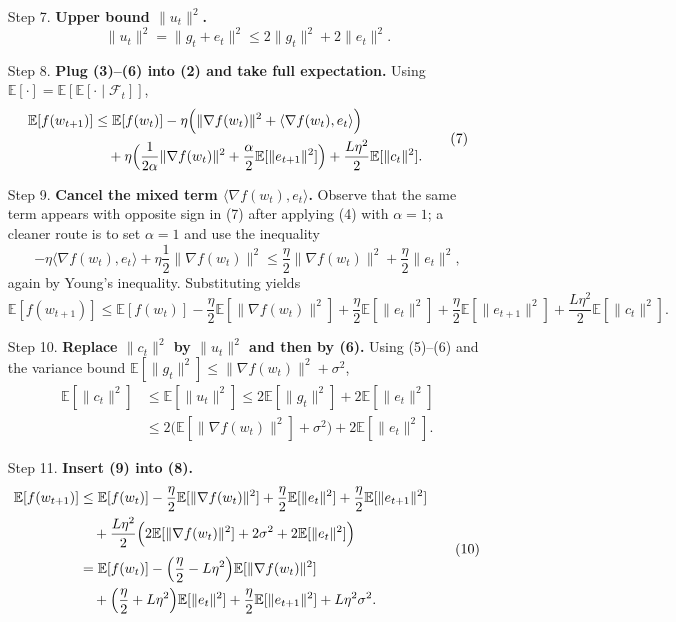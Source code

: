 \documentclass{article}
\newcommand{\E}{\mathbb{E}}
\begin{document}
\begin{enumerate}
\item[Step 7.] \textbf{Upper bound $\|u_{t}\|^{2}$.}
\[
    \|u_{t}\|^{2}= \|g_{t}+e_{t}\|^{2}
    \le 2\|g_{t}\|^{2}+2\|e_{t}\|^{2}. \tag{6}
\]

\item[Step 8.] \textbf{Plug (3)–(6) into (2) and take full expectation.}  
Using $\E[\cdot]=\E[\E[\cdot\mid\mathcal{F}_{t}]]$,
\[
\begin{aligned}
    \E[f(w_{t+1})] &\le \E[f(w_{t})]
        -\eta\Bigl(\|\nabla f(w_{t})\|^{2}
            +\langle\nabla f(w_{t}),e_{t}\rangle\Bigr) \\
    &\quad +\eta\Bigl(\frac{1}{2\alpha}\|\nabla f(w_{t})\|^{2}
            +\frac{\alpha}{2}\E[\|e_{t+1}\|^{2}]\Bigr)
        +\frac{L\eta^{2}}{2}\E[\|c_{t}\|^{2}].
\end{aligned}
\tag{7}
\]

\item[Step 9.] \textbf{Cancel the mixed term $\langle\nabla f(w_{t}),e_{t}\rangle$.}  
Observe that the same term appears with opposite sign in (7) after applying (4) with $\alpha=1$; a cleaner route is to set $\alpha=1$ and use the inequality
\[
    -\eta\langle\nabla f(w_{t}),e_{t}\rangle
    +\eta\frac{1}{2}\|\nabla f(w_{t})\|^{2}
    \le \frac{\eta}{2}\|\nabla f(w_{t})\|^{2}
        +\frac{\eta}{2}\|e_{t}\|^{2},
\]
again by Young’s inequality.  Substituting yields
\[
    \E[f(w_{t+1})]\le \E[f(w_{t})]
        -\frac{\eta}{2}\E[\|\nabla f(w_{t})\|^{2}]
        +\frac{\eta}{2}\E[\|e_{t}\|^{2}]
        +\frac{\eta}{2}\E[\|e_{t+1}\|^{2}]
        +\frac{L\eta^{2}}{2}\E[\|c_{t}\|^{2}].
\tag{8}
\]

\item[Step 10.] \textbf{Replace $\|c_{t}\|^{2}$ by $\|u_{t}\|^{2}$ and then by (6).}
Using (5)–(6) and the variance bound $\E[\|g_{t}\|^{2}]\le \|\nabla f(w_{t})\|^{2}+\sigma^{2}$,
\[
\begin{aligned}
    \E[\|c_{t}\|^{2}]
    &\le \E[\|u_{t}\|^{2}]
    \le 2\E[\|g_{t}\|^{2}]+2\E[\|e_{t}\|^{2}]\\
    &\le 2\bigl(\E[\|\nabla f(w_{t})\|^{2}]+\sigma^{2}\bigr)
        +2\E[\|e_{t}\|^{2}].
\end{aligned}
\tag{9}
\]

\item[Step 11.] \textbf{Insert (9) into (8).}
\[
\begin{aligned}
    \E[f(w_{t+1})] &\le \E[f(w_{t})]
        -\frac{\eta}{2}\E[\|\nabla f(w_{t})\|^{2}]
        +\frac{\eta}{2}\E[\|e_{t}\|^{2}]
        +\frac{\eta}{2}\E[\|e_{t+1}\|^{2}]\\
    &\quad +\frac{L\eta^{2}}{2}\Bigl(
            2\E[\|\nabla f(w_{t})\|^{2}]
            +2\sigma^{2}
            +2\E[\|e_{t}\|^{2}]
        \Bigr)\\[1mm]
    &=\E[f(w_{t})]
        -\Bigl(\frac{\eta}{2}-L\eta^{2}\Bigr)\E[\|\nabla f(w_{t})\|^{2}]\\
    &\quad +\Bigl(\frac{\eta}{2}+L\eta^{2}\Bigr)\E[\|e_{t}\|^{2}]
        +\frac{\eta}{2}\E[\|e_{t+1}\|^{2}]
        +L\eta^{2}\sigma^{2}.
\end{aligned}
\tag{10}
\]


\end{enumerate}
\end{document}
